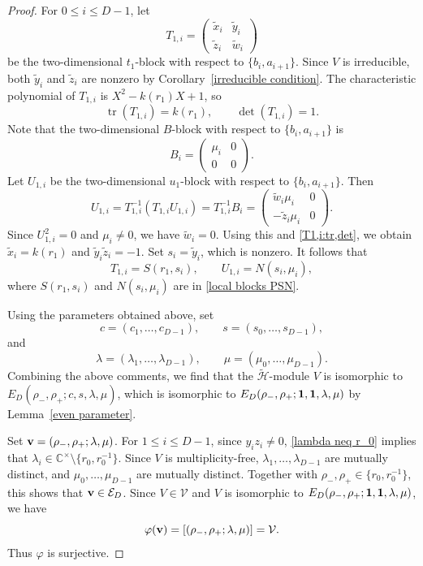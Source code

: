 \documentclass[reqno]{amsart}
\theoremstyle{definition}
\begin{document}
\begin{proof}
For $0\leq i\leq D-1$, let
$$
T_{1,i}=
\begin{pmatrix}
\tilde{x}_i&\tilde{y}_i\\
\tilde{z}_i&\tilde{w}_i
\end{pmatrix}
$$
be the two-dimensional $t_1$-block with respect to
$\{b_i,a_{i+1}\}$.
Since $V$ is irreducible, both $\tilde{y}_i$ and $\tilde{z}_i$ are nonzero
by Corollary~\ref{irreducible condition}.
The characteristic polynomial of $T_{1,i}$ is
$X^2-k(r_1)X+1$, so
\begin{equation}\label{T1,i:tr,det}
\operatorname{tr}(T_{1,i})=k(r_1),
\qquad
\det(T_{1,i})=1.
\end{equation}
Note that the two-dimensional $B$-block with respect to
$\{b_i,a_{i+1}\}$ is
$$
B_i=
\begin{pmatrix}
\mu_i&0\\
0&0
\end{pmatrix}.
$$
%
Let $U_{1,i}$ be the two-dimensional $u_1$-block with respect to
$\{b_i,a_{i+1}\}$.
Then
$$
U_{1,i}
=T_{1,i}^{-1}(T_{1,i}U_{1,i})
=T_{1,i}^{-1}B_i
=
\begin{pmatrix}
\tilde{w}_i\mu_i&0\\
-\tilde{z}_i\mu_i&0
\end{pmatrix}.
$$
Since $U_{1,i}^2=0$ and $\mu_i\neq0$, we have
$\tilde{w}_i=0$.
Using this and \eqref{T1,i:tr,det}, we obtain
$\tilde{x}_i=k(r_1)$ and $\tilde{y}_i\tilde{z}_i=-1$.
Set $s_i=\tilde{y}_i$, which is nonzero.
It follows that
$$
T_{1,i}=S(r_1,s_i),
\qquad
U_{1,i}=N(s_i,\mu_i),
$$
where $S(r_1,s_i)$ and $N(s_i,\mu_i)$ are in
\eqref{local blocks PSN}.

Using the parameters obtained above, set
$$
c=(c_1,\dots,c_{D-1}),
\qquad
s=(s_0,\dots,s_{D-1}),
$$
and
$$
\lambda=(\lambda_1,\dots,\lambda_{D-1}),
\qquad
\mu=(\mu_0,\dots,\mu_{D-1}).
$$
Combining the above comments, we find that the $\widetilde{\mathcal H}$-module $V$ is isomorphic to
$E_D(\rho_-,\rho_+;c,s,\lambda,\mu)$, which is isomorphic to
$E_D(\rho_-,\rho_+;{\bf 1},{\bf 1},\lambda,\mu)$
by Lemma~\ref{even parameter}.

Set ${\bf v}=(\rho_-,\rho_+;\lambda,\mu)$.
For $1\leq i\leq D-1$, since $y_i z_i\neq0$,
\eqref{lambda neq r_0} implies that
$\lambda_i\in\mathbb{C}^{\times}\setminus\{r_0,r_0^{-1}\}$.
Since $V$ is multiplicity-free,
$\lambda_1,\dots,\lambda_{D-1}$ are mutually distinct, and
$\mu_0,\dots,\mu_{D-1}$ are mutually distinct.
Together with
$\rho_-,\rho_+\in\{r_0,r_0^{-1}\}$, this shows that
${\bf v}\in\mathcal{E}_D$.
Since $V\in\mathcal{V}$ and $V$ is isomorphic to
$E_D(\rho_-,\rho_+;{\bf 1},{\bf 1},\lambda,\mu)$, we have
$$
\varphi({\bf v})
=
[(\rho_-,\rho_+;\lambda,\mu)]
=
\mathcal{V}.
$$
Thus $\varphi$ is surjective.


\end{proof}
\end{document}
